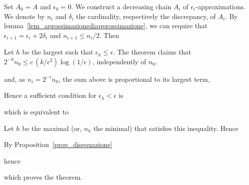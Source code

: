 \documentclass[sputnik.tex]{subfiles}
\begin{document}
\begin{void_thm}\rm
Set $A_0=A$ and $\epsilon_0=0$. We construct a decreasing chain $A_i$ of $\epsilon_i$-approximations.
We denote by $n_i$ and $\delta_i$ the cardinality, respectively the discrepancy, of $A_i$.
By lemma~\ref{lem_aprossimazionediapprossimazione}, we can require that $\epsilon_{i+1}=\epsilon_i+2\delta_i$ and $n_{i+1}\le n_i/2$.
Then


Let $h$ be the largest such that $\epsilon_h\le\epsilon$. The theorem claims that $\displaystyle 2^{-h}n_0\le c\,(k/\epsilon^2)\log(1/\epsilon)$, independently of $n_0$. 



and, as $n_i=2^{-i}n_0$, the sum above is proportional to its largest term,


Hence a sufficient condition for $\epsilon_h<\epsilon$ is 


which is equivalent to


Let $h$ be the maximal (or, $n_h$ the minimal) that satisfies this inequality. Hence



By Proposition~\ref{prop_disequazione}


hence 



which proves the theorem.
\end{void_thm}


 
\end{document}
